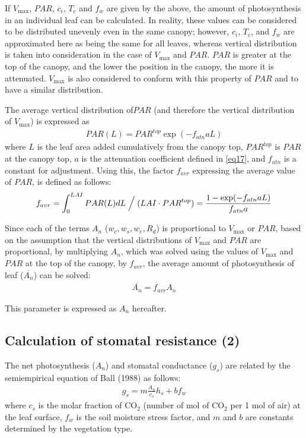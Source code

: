 If \(V_{\max}\), \(PAR\), \(c_i\), \(T_c\) and \(f_w\) are given by the above, the amount of photosynthesis in an individual leaf can be calculated. In reality, these values can be considered to be
distributed unevenly even in the same canopy; however, \(c_i\), \(T_c\), and \(f_w\) are approximated here as being the same for all leaves, whereas vertical distribution is taken into consideration
in the case of \(V_{\max}\) and \(PAR\). \(PAR\) is greater at the top of the canopy, and the lower the position in the canopy, the more it is attenuated. \(V_{\max}\) is also considered to conform
with this property of \(PAR\) and to have a similar distribution.

The average vertical distribution of\(PAR\) (and therefore the vertical distribution of \(V_{\max}\)) is expressed as \begin{eqnarray}
 PAR(L) = PAR^{top} \exp(- f_{atn} a L)
\end{eqnarray} where \(L\) is the leaf area added cumulatively from the canopy top, \(PAR^{top}\) is \(PAR\) at the canopy top, \(a\) is the attenuation coefficient defined in \ref{eq17}, and
\(f_{atn}\) is a constant for adjustment. Using this, the factor \(f_{avr}\) expressing the average value of \(PAR\), is defined as follows: \begin{eqnarray}
 f_{avr} = \int_0^{LAI} PAR(L) dL \Bigm / (LAI \cdot PAR^{top})
 = \frac{1 - \exp(- f_{atn} a L)}{f_{atn} a}
\end{eqnarray}

Since each of the terms \(A_n\) (\(w_c, w_s, w_e, R_d\)) is proportional to \(V_{\max}\) or \(PAR\), based on the assumption that the vertical distributions of \(V_{\max}\) and \(PAR\) are
proportional, by multiplying \(A_n\), which was solved using the values of \(V_{\max}\) and \(PAR\) at the top of the canopy, by \(f_{avr}\), the average amount of photosynthesis of leaf
(\(\overline{A_n}\)) can be solved: \begin{eqnarray}
 \overline{A_n} = f_{avr} A_n
\end{eqnarray}

This parameter is expressed as \(A_n\) hereafter.

\hypertarget{calculation-of-stomatal-resistance-2}{%
\subsection{Calculation of stomatal resistance (2)}\label{calculation-of-stomatal-resistance-2}}

The net photosynthesis (\(A_n\)) and stomatal conductance (\(g_s\)) are related by the semiempirical equation of Ball (1988) as follows: \begin{eqnarray}
 g_s = m \frac {A_n}{c_s} h_s + b f_w \label{eq93}
\end{eqnarray} where \(c_s\) is the molar fraction of \(\mathrm{CO_2}\) (number of mol of \(\mathrm{CO_2}\) per 1 mol of air) at the leaf surface, \(f_w\) is the soil moisture stress factor, and \(m\) and \(b\)
are constants determined by the vegetation type.

